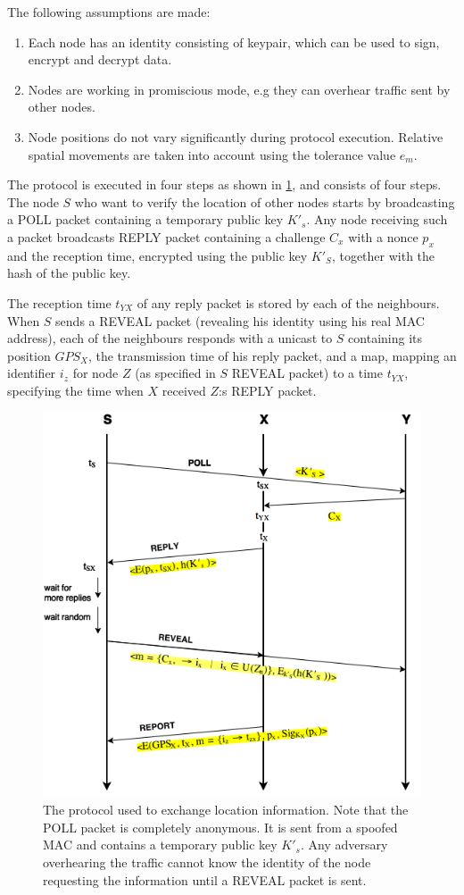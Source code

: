 \documentclass{article}
\begin{document}
The following assumptions are made:
\begin{enumerate}
    \item Each node has an identity consisting of keypair, which can be used to sign, encrypt and decrypt data.
    \item Nodes are working in promiscious mode, e.g they can overhear traffic sent by other nodes.
    \item Node positions do not vary significantly during protocol execution. Relative spatial movements are taken into account using the tolerance value $e_m$.
\end{enumerate}
\noindent
The protocol is executed in four steps as shown in \ref{fig:secureloc}, and consists of four steps. The node $S$ who want to verify the location of other nodes starts by broadcasting a POLL packet containing a temporary public key $K'_s$. Any node receiving such a packet broadcasts REPLY packet containing a challenge $C_x$ with a nonce $p_x$ and the reception time, encrypted using the public key $K'_S$, together with the hash of the public key.

The reception time $t_{YX}$ of any reply packet is stored by each of the neighbours. When $S$ sends a REVEAL packet (revealing his identity using his real MAC address), each of the neighbours responds with a unicast to $S$ containing its position $GPS_X$, the transmission time of his reply packet, and a map, mapping an identifier $i_z$ for node $Z$ (as specified in $S$ REVEAL packet) to a time $t_{YX}$, specifying the time when $X$ received $Z$:s REPLY packet.
\begin{figure}
    \centering
    \includegraphics[width=12cm]{secureloc}
    \caption{The protocol used to exchange location information. Note that the POLL packet is completely anonymous. It is sent from a spoofed MAC and contains a temporary public key $K'_s$. Any adversary overhearing the traffic cannot know the identity of the node requesting the information until a REVEAL packet is sent.}
    \label{fig:secureloc}
\end{figure}
\end{document}
